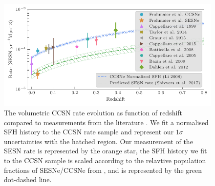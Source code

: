 \documentclass[a4paper,fleqn,usenatbib]{mnras}
\begin{document}
\begin{figure}
	\includegraphics[width=\linewidth]{./allCC_Compare_Literature.pdf}
    \caption{The volumetric CCSN rate evolution as function of redshift compared to measurements from the literature \citep{1999A&A...351..459C,2014ApJ...792..135T,2015MNRAS.450..905G,2015A&A...584A..62C,2008A&A...479...49B,2005A&A...430...83C,2009A&A...499..653B,2012ApJ...757...70D}. We fit a normalised SFH history \citep[blue dashed line;][]{2008MNRAS.388.1487L} to the CCSN rate sample and represent our $1\sigma$ uncertainties with the hatched region. Our measurement of the SESN rate is represented by the orange star, the SFH history we fit to the CCSN sample is scaled according to the relavtive population fractions of SESNe/CCSNe from \citet{2017PASP..129e4201S}, and is represented by the green dot-dashed line.}
    \label{fig:rates_CC_lit}
\end{figure}
\end{document}
